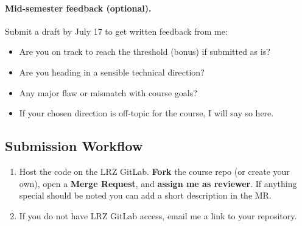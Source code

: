 \paragraph{Mid-semester feedback (optional).}
Submit a draft by July 17 to get written feedback from me:
\begin{itemize}
    \item Are you on track to reach the threshold (bonus) if submitted as is?
    \item Are you heading in a sensible technical direction?
    \item Any major flaw or mismatch with course goals?
    \item If your chosen direction is off-topic for the course, I will say so here.
\end{itemize}

\subsection*{Submission Workflow}
\begin{enumerate}[label=\arabic*.]
    \item Host the code on the LRZ GitLab. \textbf{Fork} the course repo (or create your own), open a \textbf{Merge Request}, and \textbf{assign me as reviewer}. If anything special should be noted you can add a short description in the MR.
    \item If you do not have LRZ GitLab access, email me a link to your repository.
\end{enumerate}

